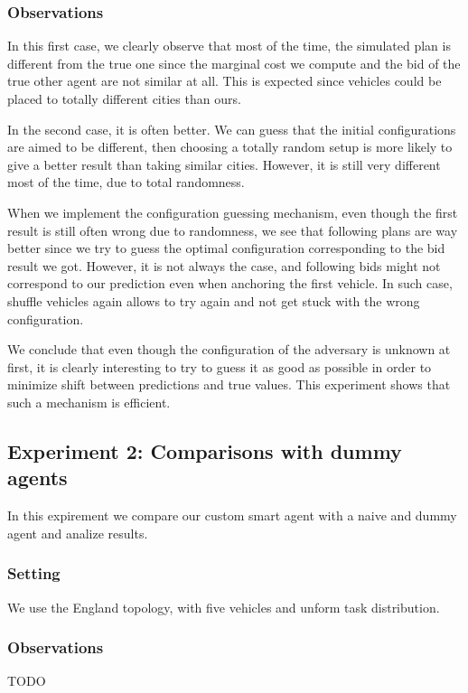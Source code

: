 \documentclass[11pt]{article}
\begin{document}
\subsubsection{Observations}

In this first case, we clearly observe that most of the time, the simulated plan is different from the true one since the marginal cost we compute and the bid of the true other agent are not similar at all. This is expected since vehicles could be placed to totally different cities than ours.

In the second case, it is often better. We can guess that the initial configurations are aimed to be different, then choosing a totally random setup is more likely to give a better result than taking similar cities. However, it is still very different most of the time, due to total randomness.

When we implement the configuration guessing mechanism, even though the first result is still often wrong due to randomness, we see that following plans are way better since we try to guess the optimal configuration corresponding to the bid result we got. However, it is not always the case, and following bids might not correspond to our prediction even when anchoring the first vehicle. In such case, shuffle vehicles again allows to try again and not get stuck with the wrong configuration.

We conclude that even though the configuration of the adversary is unknown at first, it is clearly interesting to try to guess it as good as possible in order to minimize shift between predictions and true values. This experiment shows that such a mechanism is efficient.


\subsection{Experiment 2: Comparisons with dummy agents}
In this expirement we compare our custom smart agent with a naive and dummy agent and analize results.

\subsubsection{Setting}
We use the England topology, with five vehicles and unform task distribution.

\subsubsection{Observations}
TODO
\end{document}
